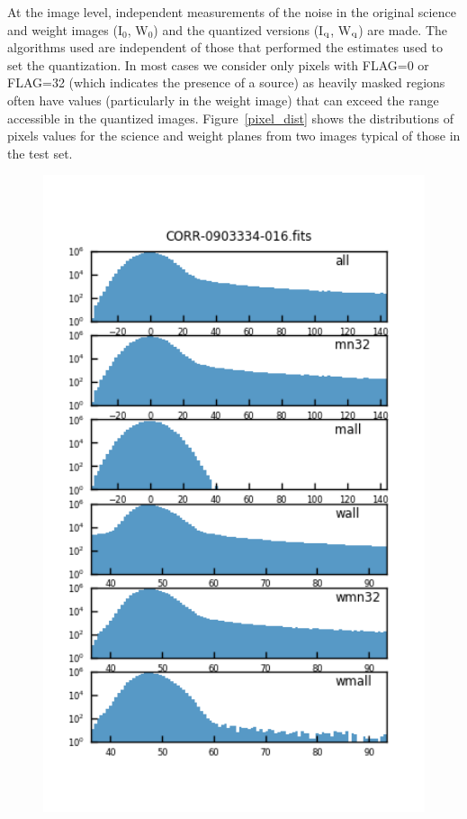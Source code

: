 At the image level, independent measurements of the noise in the original science 
and weight images (I$_{0}$, W$_{0}$) and the quantized versions (I$_{\rm q}$, W$_{\rm q}$) are made.
The algorithms used are independent of those that performed the estimates used to set the quantization.
In most cases we consider only pixels with FLAG=0 or FLAG=32 (which indicates the presence of a source)
as heavily masked regions often have values (particularly in the weight image) that can exceed the 
range accessible in the quantized images.  Figure~\ref{pixel_dist} shows the distributions of pixels
values for the science and weight planes from two images typical of those in the test set.

\begin{figure}
\centering
  \begin{minipage}{.475\textwidth}
    \centering
    \includegraphics[width=1.0\textwidth]{figure/imgdist_CORR-0903334-016.fits.png}

\end{minipage}
\end{figure}
